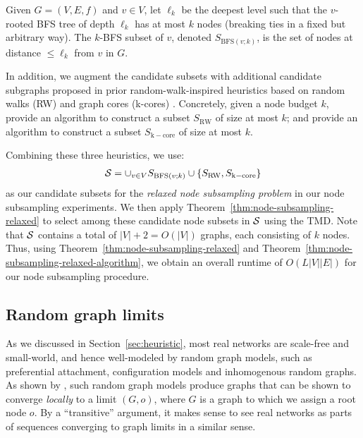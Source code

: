 \begin{definition} {Given $G = (V, E, f)$ and $v \in V$}, let $\ell_k$ be the deepest level such that the $v$-rooted BFS tree of depth $\ell_k$ has at most $k$ nodes (breaking ties in a fixed but arbitrary way). {The $k$-BFS subset of $v$, denoted $S_{\mathrm{BFS}(v;k)}$, is} the set of nodes at distance $\leq \ell_{k}$ from $v$ in $G$.
\end{definition}

In addition, we augment the candidate subsets with additional candidate subgraphs proposed in prior random-walk-inspired heuristics based on random walks (RW) \citep{razin2023ability} and graph cores (k-cores) \citep{salha2022degeneracy}. Concretely, given a node budget $k$, \citet{razin2023ability} provide an algorithm to construct a subset $S_{\mathrm{RW}}$ of size at most $k$; and \citet{salha2022degeneracy} provide an algorithm to construct a subset $S_{\mathrm{k-core}}$ of size at most $k$. 

Combining these three heuristics, we use: 
\begin{align*}
    \mathcal S = \cup_{v \in V} S_{\mathrm{BFS}(v;k)} \cup \{S_{\mathrm{RW}}, S_{\mathrm{k-core}}\} 
\end{align*}
as our candidate subsets for the \emph{relaxed node subsampling problem} in our node subsampling experiments. We then apply Theorem~\ref{thm:node-subsampling-relaxed} to select among these candidate node subsets in $\mathcal S$ using the TMD. Note that $\mathcal S$ contains a total of $|V| + 2 = O(|V|)$ graphs, each consisting of $k$ nodes. Thus, using Theorem~\ref{thm:node-subsampling-relaxed} and Theorem~\ref{thm:node-subsampling-relaxed-algorithm}, we obtain an overall runtime of $O(L |V| |E|)$ for our node subsampling procedure.

\subsection{Random graph limits}\label{sec:random-graph-limits}

As we discussed in Section~\ref{sec:heuristic}, most real networks are scale-free and small-world, and hence well-modeled by random graph models, such as preferential attachment, configuration models and inhomogenous random graphs. As shown by \citet{van2024random}, such random graph models produce graphs that can be shown to converge \textit{locally} to a limit $(G,o)$, where $G$ is a graph to which we assign a root node $o$. By a ``transitive'' argument, it makes sense to see real networks as parts of sequences converging to graph limits in a similar sense. 

